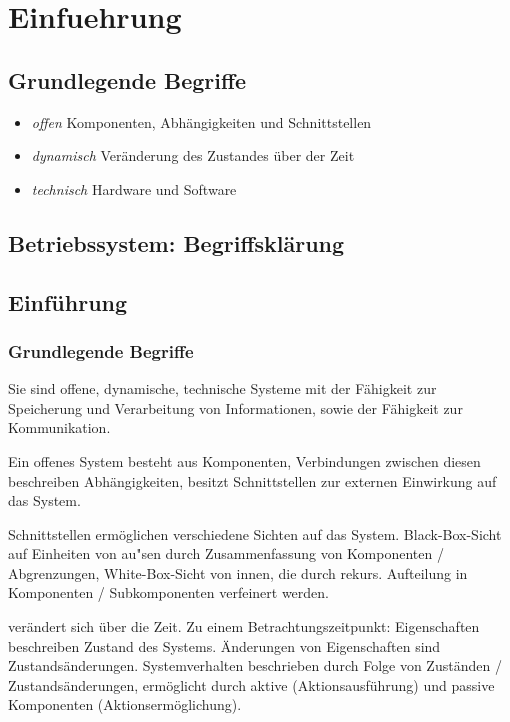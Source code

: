 \chapter{Einfuehrung}

\section{Grundlegende Begriffe}

\begin{itemize}
	\item \emph{offen} Komponenten, Abhängigkeiten und Schnittstellen
	\item \emph{dynamisch} Veränderung des Zustandes über der Zeit
	\item \emph{technisch} Hardware und Software
\end{itemize}


\section{Betriebssystem: Begriffsklärung}
\section{Einführung}
\subsection{Grundlegende Begriffe}
Sie sind offene, dynamische, technische Systeme mit der Fähigkeit zur Speicherung und Verarbeitung von Informationen, sowie der Fähigkeit zur Kommunikation.

Ein offenes System besteht aus Komponenten, Verbindungen zwischen diesen beschreiben Abhängigkeiten, besitzt Schnittstellen zur externen Einwirkung auf das System. 

Schnittstellen ermöglichen verschiedene Sichten auf das System. Black-Box-Sicht auf Einheiten von au"sen durch Zusammenfassung von Komponenten / Abgrenzungen, White-Box-Sicht von innen, die durch rekurs. Aufteilung in Komponenten / Subkomponenten verfeinert werden.
 
 verändert sich über die Zeit. Zu einem Betrachtungszeitpunkt: Eigenschaften beschreiben Zustand des Systems. Änderungen von Eigenschaften sind Zustands\-änderungen. System\-verhalten beschrieben durch Folge von Zuständen / Zustandsänderungen, ermöglicht durch aktive (Aktionsausführung) und passive Komponenten (Aktionsermöglichung).  

